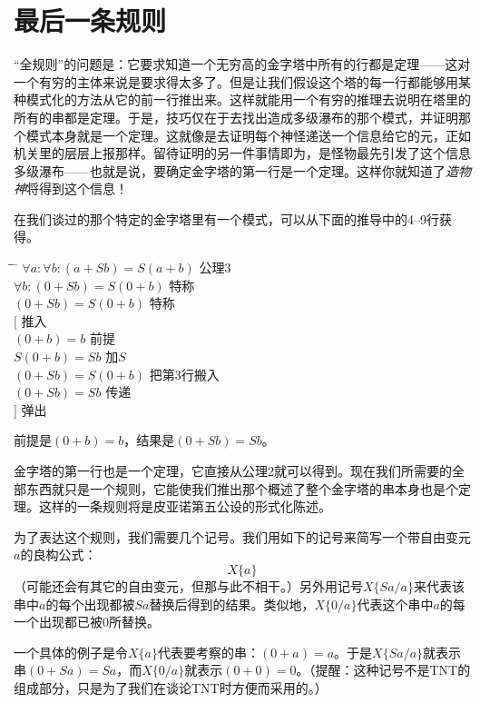 \section{最后一条规则}

“全规则”的问题是：它要求知道一个无穷高的金字塔中所有的行都是定理——这对一个有穷的主体来说是要求得太多了。但是让我们假设这个塔的每一行都能够用某种模式化的方法从它的前一行推出来。这样就能用一个有穷的推理去说明在塔里的所有的串都是定理。于是，技巧仅在于去找出造成多级瀑布的那个模式，并证明那个模式本身就是一个定理。这就像是去证明每个神怪递送一个信息给它的元，正如机关里的层层上报那样。留待证明的另一件事情即为，是怪物最先引发了这个信息多级瀑布——也就是说，要确定金字塔的第一行是一个定理。这样你就知道了\emph{造物神}将得到这个信息！

在我们谈过的那个特定的金字塔里有一个模式，可以从下面的推导中的4--9行获得。

\begin{tabbing*}
\qquad\qquad \= \quad \= \tabindent{-2em} \= \+\kill
$\forall a:\forall b:(a+Sb)=S(a+b)$ \> \>公理3\\
$\forall b:(0+Sb)=S(0+b)$ \>           \>特称\\
$(0+Sb)=S(0+b)$ \>                     \>特称\\
$[$ \>                                 \>推入\+\\
  $(0+b)=b$                            \>前提\\
  $S(0+b)=Sb$                          \>加$S$\\
  $(0+Sb)=S(0+b)$                      \>把第3行搬入\\
  $(0+Sb)=Sb$                          \>传递\-\\
$]$ \>                                 \>弹出
\end{tabbing*}
前提是$(0+b)=b$，结果是$(0+Sb)=Sb$。

金字塔的第一行也是一个定理，它直接从公理2就可以得到。现在我们所需要的全部东西就只是一个规则，它能使我们推出那个概述了整个金字塔的串本身也是个定理。这样的一条规则将是皮亚诺第五公设的形式化陈述。

为了表达这个规则，我们需要几个记号。我们用如下的记号来简写一个带自由变元$a$的良构公式：
\[
X\{a\}
\]
（可能还会有其它的自由变元，但那与此不相干。）另外用记号$X\{Sa/a\}$来代表该串中$a$的每个出现都被$Sa$替换后得到的结果。类似地，$X\{0/a\}$代表这个串中$a$的每一个出现都已被$0$所替换。

一个具体的例子是令$X\{a\}$代表要考察的串：$(0+a)=a$。于是$X\{Sa/a\}$就表示串$(0+Sa)=Sa$，而$X\{0/a\}$就表示$(0+0)=0$。（提醒：这种记号不是TNT的组成部分，只是为了我们在谈论TNT时方便而采用的。）

